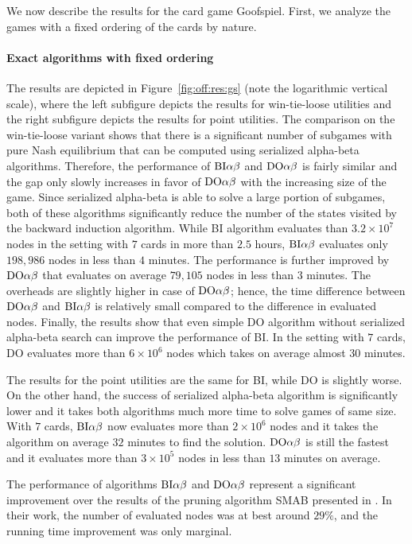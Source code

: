 We now describe the results for the card game Goofspiel.
First, we analyze the games with a fixed ordering of the cards by nature. 

\paragraph{Exact algorithms with fixed ordering}
The results are depicted in Figure~\ref{fig:off:res:gs} (note the logarithmic vertical scale), where the left subfigure depicts the results for win-tie-loose utilities and the right subfigure depicts the results for point utilities.
The comparison on the win-tie-loose variant shows that there is a significant number of subgames with pure Nash equilibrium that can be computed using serialized alpha-beta algorithms.
Therefore, the performance of $\textrm{BI}\alpha\beta$ and $\textrm{DO}\alpha\beta$ is fairly similar and the gap only slowly increases in favor of $\textrm{DO}\alpha\beta$ with the increasing size of the game.
Since serialized alpha-beta is able to solve a large portion of subgames, both of these algorithms significantly reduce the number of the states visited by the backward induction algorithm.
While \textsc{BI} algorithm evaluates than $3.2\times10^7$ nodes in the setting with $7$ cards in more than $2.5$ hours, $\textrm{BI}\alpha\beta$ evaluates only $198,986$ nodes in less than $4$ minutes. 
The performance is further improved by $\textrm{DO}\alpha\beta$ that evaluates on average $79,105$ nodes in less than $3$ minutes.
The overheads are slightly higher in case of $\textrm{DO}\alpha\beta$; hence, the time difference between $\textrm{DO}\alpha\beta$ and $\textrm{BI}\alpha\beta$ is relatively small compared to the difference in evaluated nodes.
Finally, the results show that even simple \textsc{DO} algorithm without serialized alpha-beta search can improve the performance of \textsc{BI}.
In the setting with $7$ cards, \textsc{DO} evaluates more than $6\times10^6$ nodes which takes on average almost 30 minutes.

The results for the point utilities are the same for BI, while DO is slightly worse. 
On the other hand, the success of serialized alpha-beta algorithm is significantly lower and it takes both algorithms much more time to solve games of same size.
With $7$ cards, $\textrm{BI}\alpha\beta$ now evaluates more than $2\times10^6$ nodes and it takes the algorithm on average $32$ minutes to find the solution.
$\textrm{DO}\alpha\beta$ is still the fastest and it evaluates more than $3\times10^5$ nodes in less than $13$ minutes on average.

The performance of algorithms $\textrm{BI}\alpha\beta$ and $\textrm{DO}\alpha\beta$ represent a significant improvement over the results of the pruning algorithm 
SMAB presented in \cite{Saffidine12SMAB}. 
In their work, the number of evaluated nodes was at best around $29\%$, and the running time improvement was only marginal. 

